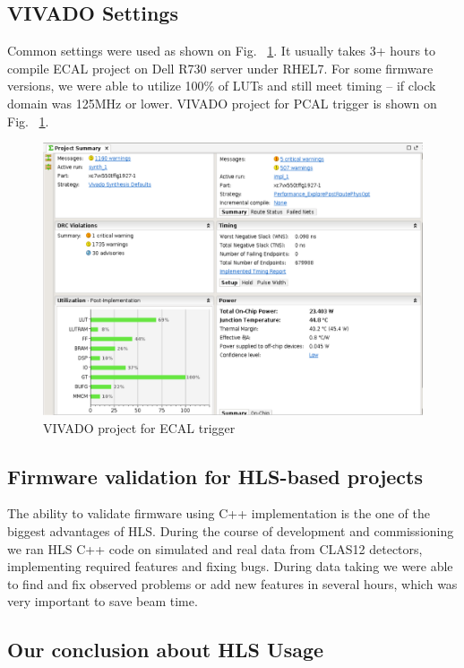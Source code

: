 \subsection{VIVADO Settings}

Common settings were used as shown on Fig. ~\ref{fig:vivado}. It usually takes 3+ hours to compile ECAL  project on Dell R730 server under RHEL7. For some firmware versions, we were able to utilize 100\% of LUTs and still meet timing – if clock domain was 125MHz or lower. VIVADO project for PCAL trigger is shown on Fig. ~\ref{fig:vivado}.

\begin{figure}[hbt]
	\centering
	\includegraphics[width=1.0\columnwidth,keepaspectratio]{img/vivado.png}
	\caption{VIVADO project for ECAL trigger}
	\label{fig:vivado}
\end{figure}

\subsection{Firmware validation for HLS-based projects}

The ability to validate firmware using C++ implementation is the one of the biggest advantages of HLS. During the course of development and commissioning we ran HLS C++ code on simulated and real data from CLAS12 detectors, implementing required features and fixing bugs. During data taking we were able to find and fix observed problems or add new features in several hours, which was very important to save beam time.

\subsection{Our conclusion about HLS Usage}

